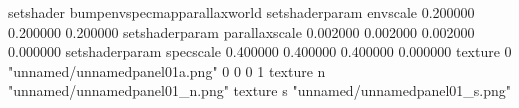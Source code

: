 setshader bumpenvspecmapparallaxworld
setshaderparam envscale 0.200000 0.200000 0.200000
setshaderparam parallaxscale 0.002000 0.002000 0.002000 0.000000
setshaderparam specscale 0.400000 0.400000 0.400000 0.000000
texture 0 "unnamed/unnamedpanel01a.png" 0 0 0 1
texture n "unnamed/unnamedpanel01_n.png"
texture s "unnamed/unnamedpanel01_s.png"